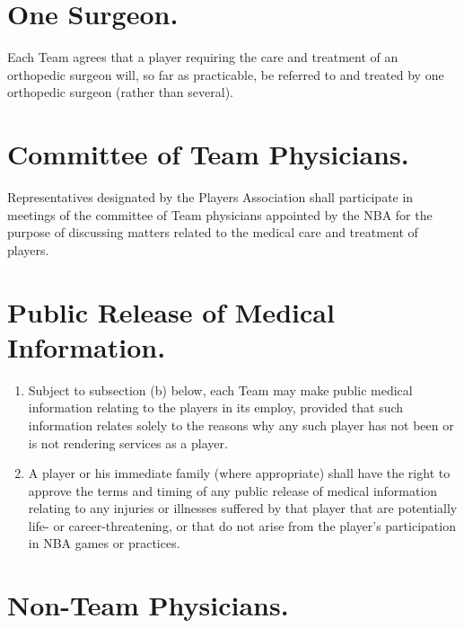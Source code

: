 \documentclass[
]{book}
\providecommand{\tightlist}{%
  \setlength{\itemsep}{0pt}\setlength{\parskip}{0pt}}
\begin{document}

\hypertarget{one-surgeon.}{%
\section{One Surgeon.}\label{one-surgeon.}}

Each Team agrees that a player requiring the care and treatment of an orthopedic surgeon will, so far as practicable, be referred to and treated by one orthopedic surgeon (rather than several).

\hypertarget{committee-of-team-physicians.}{%
\section{Committee of Team Physicians.}\label{committee-of-team-physicians.}}

Representatives designated by the Players Association shall participate in meetings of the committee of Team physicians appointed by the NBA for the purpose of discussing matters related to the medical care and treatment of players.

\hypertarget{public-release-of-medical-information.}{%
\section{Public Release of Medical Information.}\label{public-release-of-medical-information.}}

\begin{enumerate}
\def\labelenumi{(\alph{enumi})}
\tightlist
\item
  Subject to subsection (b) below, each Team may make public medical information relating to the players in its employ, provided that such information relates solely to the reasons why any such player has not been or is not rendering services as a player.
\item
  A player or his immediate family (where appropriate) shall have the right to approve the terms and timing of any public release of medical information relating to any injuries or illnesses suffered by that player that are potentially life- or career-threatening, or that do not arise from the player's participation in NBA games or practices.
\end{enumerate}

\hypertarget{non-team-physicians.}{%
\section{Non-Team Physicians.}\label{non-team-physicians.}}
\end{document}
